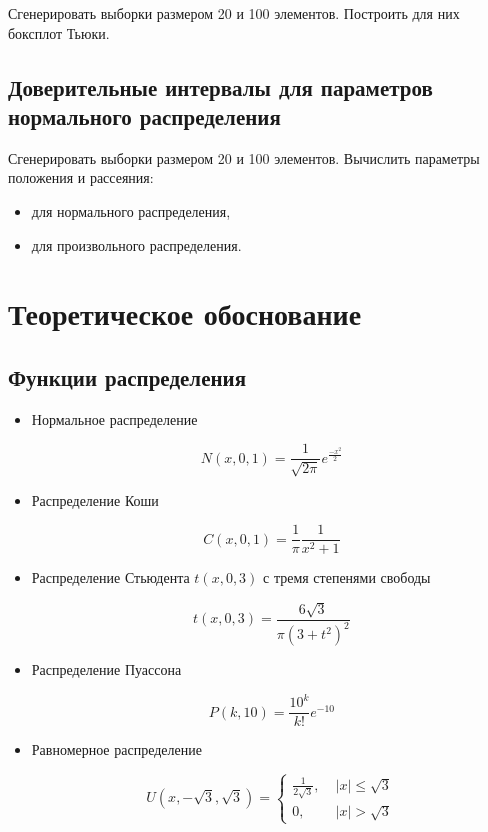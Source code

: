 \documentclass[12pt,a4paper]{article}
\begin{document}
	Сгенерировать выборки размером 20 и 100 элементов. Построить для них боксплот Тьюки.

	\subsection{Доверительные интервалы для параметров нормального распределения}

	Сгенерировать выборки размером 20 и 100 элементов. Вычислить параметры положения и рассеяния:

	\begin{itemize}
		\item для нормального распределения,
		\item для произвольного распределения.
	\end{itemize}

	\section{Теоретическое обоснование}

	\subsection{Функции распределения}

	\begin{itemize}
		\item Нормальное распределение

		\begin{equation} \label{eq:normal}
			N(x, 0, 1) = \frac{1}{\sqrt{2\pi}}e^\frac{-x^2}{2}
		\end{equation}

		\item Распределение Коши

		\begin{equation} \label{eq:cauchy}
			C(x, 0, 1) = \frac{1}{\pi}\frac{1}{x^2+1}
		\end{equation}

		\item Распределение Стьюдента $t(x, 0, 3)$ с тремя степенями свободы

		\begin{equation} \label{eq:student}
			t(x, 0, 3) = \frac{6\sqrt3}{\pi(3 + t^2)^2}
		\end{equation}

		\item Распределение Пуассона

		\begin{equation} \label{eq:poisson}
			P(k, 10) = \frac{10^k}{k!}e^{-10}
		\end{equation}

		\item Равномерное распределение

		\begin{equation} \label{eq:uniform}
			U(x, -\sqrt3, \sqrt3) = \begin{cases}
				\frac{1}{2\sqrt3}, & \; |x| \leq \sqrt3\\
				0, & \; |x| > \sqrt3
			\end{cases}
		\end{equation}
	\end{itemize}
\end{document}
